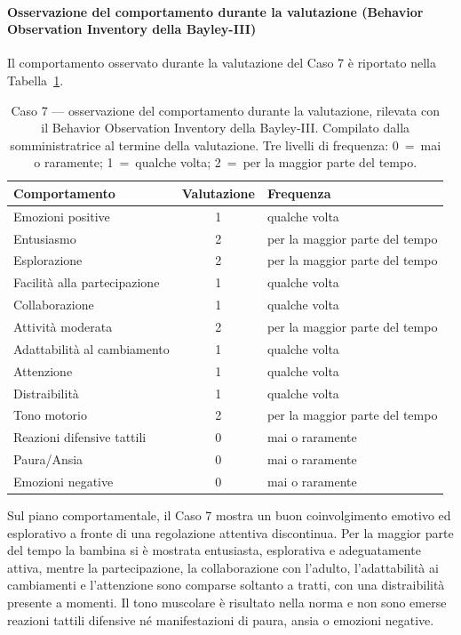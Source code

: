  \paragraph*{Osservazione del comportamento durante la valutazione (Behavior Observation Inventory della Bayley-III)}

Il comportamento osservato durante la valutazione del Caso 7 è riportato nella Tabella~\ref{tab:caso7_boi}.

\begin{table}[htbp]
\centering
\caption[Caso 7 --- osservazione del comportamento durante la valutazione]{Caso 7 --- osservazione del comportamento durante la valutazione, rilevata con il Behavior Observation Inventory della Bayley-III. Compilato dalla somministratrice al termine della valutazione. Tre livelli di frequenza: 0~=~mai o raramente; 1~=~qualche volta; 2~=~per la maggior parte del tempo.}
\label{tab:caso7_boi}
\begin{tabular}{|l|c|l|}
\toprule
\textbf{Comportamento} & \textbf{Valutazione} & \textbf{Frequenza} \\
\midrule
Emozioni positive & 1 & qualche volta \\
Entusiasmo & 2 & per la maggior parte del tempo \\
Esplorazione & 2 & per la maggior parte del tempo \\
Facilità alla partecipazione & 1 & qualche volta \\
Collaborazione & 1 & qualche volta \\
Attività moderata & 2 & per la maggior parte del tempo \\
Adattabilità al cambiamento & 1 & qualche volta \\
Attenzione & 1 & qualche volta \\
Distraibilità & 1 & qualche volta \\
Tono motorio & 2 & per la maggior parte del tempo \\
Reazioni difensive tattili & 0 & mai o raramente \\
Paura/Ansia & 0 & mai o raramente \\
Emozioni negative & 0 & mai o raramente \\
\bottomrule
\end{tabular}
\end{table}

Sul piano comportamentale, il Caso 7 mostra un buon coinvolgimento emotivo ed esplorativo a fronte di una regolazione attentiva discontinua. Per la maggior parte del tempo la bambina si è mostrata entusiasta, esplorativa e adeguatamente attiva, mentre la partecipazione, la collaborazione con l'adulto, l'adattabilità ai cambiamenti e l'attenzione sono comparse soltanto a tratti, con una distraibilità presente a momenti. Il tono muscolare è risultato nella norma e non sono emerse reazioni tattili difensive né manifestazioni di paura, ansia o emozioni negative.

